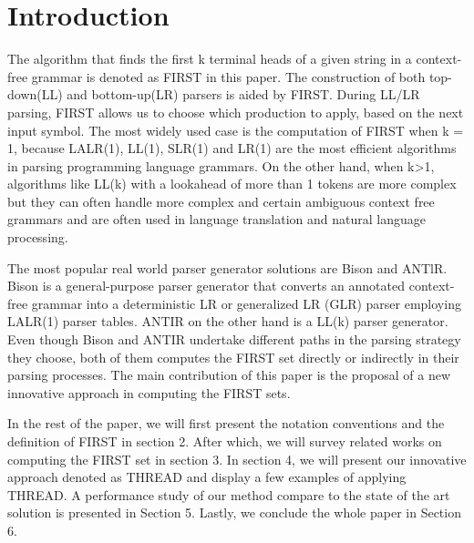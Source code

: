 \documentclass{sig-alternate-05-2015}
\begin{document}


%
%

%
%
\printccsdesc



\section{Introduction}
The algorithm that finds the first k terminal heads of a given string in a context-free grammar is denoted as FIRST in this paper. 
The construction of both top-down(LL) and bottom-up(LR) parsers is aided by FIRST. 
During LL/LR parsing, FIRST allows us to choose which production to apply, based on the next input symbol.
The most widely used case is the computation of FIRST when k = 1, because LALR(1), LL(1), SLR(1) and LR(1) are the most efficient algorithms in parsing programming language grammars. 
On the other hand, when k>1, algorithms like LL(k) with a lookahead of more than 1 tokens are more complex but they can often handle more complex and certain ambiguous context free grammars and 
are often used in language translation and natural language processing. 

The most popular real world parser generator solutions are Bison and ANTlR. 
Bison is a general-purpose parser generator that converts an annotated context-free grammar into a deterministic LR or generalized LR (GLR) parser employing LALR(1) parser tables\cite{johnson79yacc,donnelly03bison, gnu:bison}. 
ANTIR on the other hand is a LL(k) parser generator\cite{parr93ll,antlr}.
Even though Bison and ANTIR undertake different paths in the parsing strategy they choose, both of them computes the FIRST set directly or indirectly in their parsing processes.
The main contribution of this paper is the proposal of a new innovative approach in computing the FIRST sets.

In the rest of the paper, we will first present the notation conventions and the definition of FIRST in section 2. 
After which, we will survey related works on computing the FIRST set in section 3. 
In section 4, we will present our innovative approach denoted as THREAD and display a few examples of applying THREAD. A performance study of our method compare to the state of the art solution is presented in Section 5. Lastly, we conclude the whole paper in Section 6.
\end{document}
